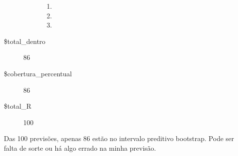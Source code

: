 \documentclass[11pt]{article}
\begin{document}
\begin{description}
\begin{description}
\begin{enumerate}
\item {}

\item {}

\item {}

\end{enumerate}

\end{description}

\item[\$total\_dentro] 86
\item[\$cobertura\_percentual] 86
\item[\$total\_R] 100
\end{description}


    
    Das 100 previsões, apenas 86 estão no intervalo preditivo bootstrap.
Pode ser falta de sorte ou há algo errado na minha previsão.


    
    
    
\end{document}
